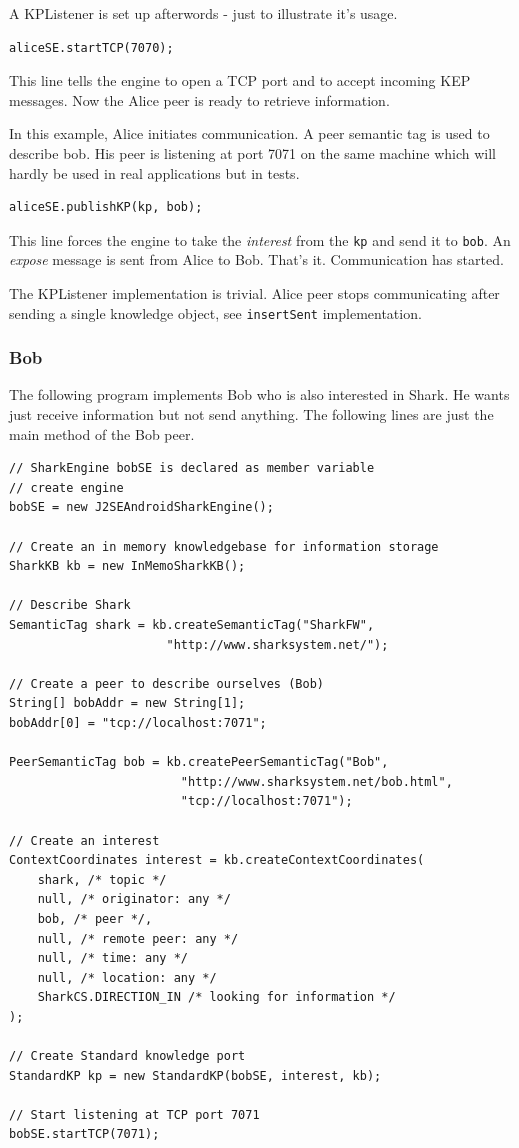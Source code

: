 A KPListener is set up afterwords - just to illustrate it's usage.

\begin{verbatim}
aliceSE.startTCP(7070);
\end{verbatim}

This line tells the engine to open a TCP port and to accept incoming KEP messages. Now the Alice peer is ready to retrieve information.

In this example, Alice initiates communication. A peer semantic tag is used to describe bob. His peer is listening at port 7071 on the same machine which will hardly be used in real applications but in tests.

\begin{verbatim}
aliceSE.publishKP(kp, bob);
\end{verbatim}

This line forces the engine to take the {\it interest} from the {\tt kp} and send it to {\tt bob}. An {\it expose} message is sent from Alice to Bob. That's it. Communication has started.

The KPListener implementation is trivial. Alice peer stops communicating after sending a single knowledge object, see {\tt insertSent} implementation.

\subsubsection{Bob}
The following program implements Bob who is also interested in Shark. He wants just receive information but not send anything. The following lines are just the main method of the Bob peer.

\begin{verbatim}
// SharkEngine bobSE is declared as member variable
// create engine
bobSE = new J2SEAndroidSharkEngine();

// Create an in memory knowledgebase for information storage
SharkKB kb = new InMemoSharkKB();

// Describe Shark
SemanticTag shark = kb.createSemanticTag("SharkFW",
                      "http://www.sharksystem.net/");

// Create a peer to describe ourselves (Bob)
String[] bobAddr = new String[1];
bobAddr[0] = "tcp://localhost:7071";

PeerSemanticTag bob = kb.createPeerSemanticTag("Bob",
                        "http://www.sharksystem.net/bob.html",
                        "tcp://localhost:7071");

// Create an interest
ContextCoordinates interest = kb.createContextCoordinates(
    shark, /* topic */
    null, /* originator: any */
    bob, /* peer */,
    null, /* remote peer: any */
    null, /* time: any */
    null, /* location: any */
    SharkCS.DIRECTION_IN /* looking for information */
);

// Create Standard knowledge port
StandardKP kp = new StandardKP(bobSE, interest, kb);

// Start listening at TCP port 7071
bobSE.startTCP(7071);
\end{verbatim}

